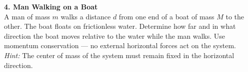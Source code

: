 {\textbf{4. Man Walking on a Boat} \\
A man of mass $m$ walks a distance $d$ from one end of a boat of mass $M$ to the other. The boat floats on frictionless water. Determine how far and in what direction the boat moves relative to the water while the man walks. Use momentum conservation — no external horizontal forces act on the system. \\
\emph{Hint:} The center of mass of the system must remain fixed in the horizontal direction.


\noindent\hrulefill

\begin{center}
\end{center}


}

